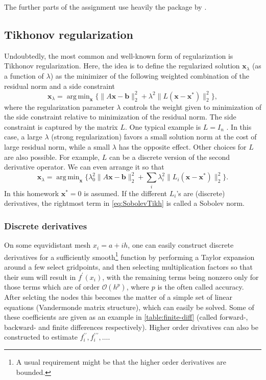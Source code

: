 \documentclass{article}
\newcommand{\mbf}[1]{\mathbf{#1}}
\DeclareMathOperator*{\argmin}{arg\,min} %
\begin{document}
	The further parts of the assignment use heavily the package by \textcite{regtools}.
	
	\subsection{Tikhonov regularization}
	Undoubtedly, the most common and well-known form of regularization is Tikhonov regularization.
	Here, the idea is to define the regularized solution $\mbf{x}_{\lambda}$ (as a function of $\lambda$) as the minimizer of the following weighted
	combination of the residual norm and a side constraint
	\begin{equation}\label{eq:basicTikh}
		\mbf{x}_{\lambda} = \argmin_{\mbf{x}} \{\|A\mbf{x} - \mbf{b}\|_2^2 + \lambda^2 \|L(\mbf{x} - \mbf{x}^{\ast} )\|_2^2\},
	\end{equation}
	where the regularization parameter $\lambda$ controls the weight given to minimization of the side constraint
	relative to minimization of the residual norm. The side constraint is captured by the matrix $L$. One
	typical example is $L = I_n$ . In this case, a large $\lambda$ (strong regularization) favors a small solution norm at the cost of large residual norm, while a small $\lambda$ has the opposite effect. Other choices for $L$ are also
	possible. For example, $L$ can be a discrete version of the second derivative operator. We can even
	arrange it so that
	\begin{equation}\label{eq:SobolevTikh}
		\mbf{x}_{\lambda} = \argmin_{\mbf{x}} \{\lambda_0^2\|A\mbf{x} - \mbf{b}\|_2^2 + \sum_i\lambda^2_i \|L_i(\mbf{x} - \mbf{x}^{\ast} )\|_2^2\}.
	\end{equation}
	In this homework $\mbf{x}^{\ast}=0$ is assumed. If the different $L_i$'s are (discrete) derivatives, the rightmost
	term in \ref{eq:SobolevTikh} is called a Sobolev norm.\\
	\subsubsection*{Discrete derivatives}
	On some equvidistant mesh $x_i = a + i h $, one can easily construct discrete derivatives for a sufficiently smooth\footnote{A usual requirement might be that the higher order derivatives are bounded.} function by performing a Taylor expansion around a few select gridpoints, and then selecting multiplication factors so that their sum will result in $f^\prime(x_i)$, with the remaining terms being nonzero only for those terms which are of order $\mathcal{O}(h^{p})$, where $p$ is the often called accuracy. After selcting the nodes this becomes the matter of a simple set of linear equations (Vandermonde matrix structure), which can easily be solved. Some of these coefficients are given as an example in \autoref{table:finite-diff} (called forward-, backward- and finite differences respectively). Higher order drivatives can also be constructed to estimate $f_i^{\prime\prime}, f_i^{\prime\prime\prime}, \dots$.
	
\end{document}
